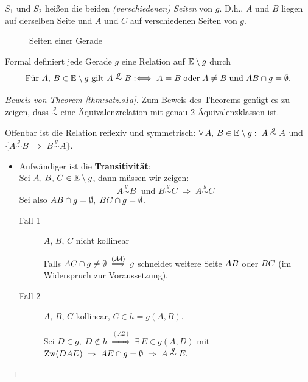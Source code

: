 $S_1$ und $S_2$ heißen die beiden \emph{(verschiedenen) Seiten} von $g$. D.h., $A$ und $B$
liegen auf derselben Seite und $A$ und $C$ auf verschiedenen Seiten von $g$.

\begin{figure}[ht]
    
    \caption{Seiten einer Gerade}
\end{figure}

Formal definiert jede Gerade $g$ eine Relation auf $\mathbb E\setminus g$ durch
$$
    \mbox{Für } A,\, B \in \mathbb E \setminus g \mbox{ gilt } A \stackrel{g}{\sim} B :
    \Longleftrightarrow\; A=B\; \mbox{oder}\; A \neq B\; \mbox{und}\; {AB} \cap g = \emptyset.
$$
\begin{proof}[Beweis von Theorem \ref{thm:satz.s1a}]
    Zum Beweis des Theorems genügt es zu zeigen, dass $\stackrel{g}{\sim}$ eine Äquivalenzrelation
    mit genau 2 Äquivalenzklassen ist.

    Offenbar ist die Relation reflexiv und symmetrisch: $\forall\, A,\, B \in \mathbb E \setminus g : \; A
    \stackrel{g}{\sim} A$ und $\{A \stackrel{g}{\sim} B\; \Rightarrow\; B \stackrel{g}{\sim} A\}$.

    \begin{itemize}
        \item Aufwändiger ist die {\bf Transitivität}:\\
        Sei $A,\, B,\, C \in \mathbb E \setminus g$, dann müssen wir zeigen:
        $$
            A \stackrel{g}{\sim} B\; \mbox{ und } B \stackrel{g}{\sim} C\; \Rightarrow\; A
            \stackrel{g}{\sim} C
        $$
        Sei also ${AB} \cap g = \emptyset,\; {BC} \cap g = \emptyset$.

        \begin{description}
            \item[Fall 1] $A,\, B,\, C$ nicht kollinear

                Falls ${AC} \cap g \neq \emptyset\; \stackrel{(A4)}{\Longrightarrow}\; g$
                schneidet weitere Seite ${AB}$ oder ${BC}$ (im Widerspruch zur
                Voraussetzung).

            \item[Fall 2] $A,\, B,\, C$ kollinear, $C \in h = g(A,B)$.

                Sei $D \in g,\; D \notin h\; \stackrel{(A2)}{\Longrightarrow}\; \exists\, E \in
                g(A,D)$ mit $\operatorname{Zw}(DAE)\; \Rightarrow\; {AE} \cap g = \emptyset\; \Rightarrow\; A
                \stackrel{g}{\sim} E.$


\end{description}
\end{itemize}
\end{proof}
